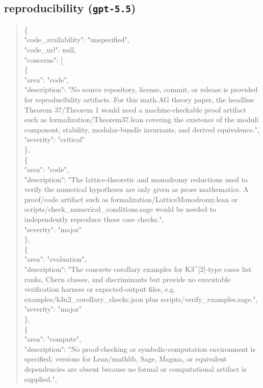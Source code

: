 \documentclass[11pt]{article}
\begin{document}
\subsection*{reproducibility (\texttt{gpt-5.5})}
\begin{quote}\small\ttfamily\raggedright
\{\\
  "code\_availability": "unspecified",\\
  "code\_url": null,\\
  "concerns": [\\
    \{\\
      "area": "code",\\
      "description": "No source repository, license, commit, or release is provided for reproducibility artifacts. For this math.AG theory paper, the headline Theorem 37/Theorem 1 would need a machine-checkable proof artifact such as formalization/Theorem37.lean covering the existence of the moduli component, stability, modular-bundle invariants, and derived equivalence.",\\
      "severity": "critical"\\
    \},\\
    \{\\
      "area": "code",\\
      "description": "The lattice-theoretic and monodromy reductions used to verify the numerical hypotheses are only given as prose mathematics. A proof/code artifact such as formalization/LatticeMonodromy.lean or scripts/check\_numerical\_conditions.sage would be needed to independently reproduce those case checks.",\\
      "severity": "major"\\
    \},\\
    \{\\
      "area": "evaluation",\\
      "description": "The concrete corollary examples for K3\^{}[2]-type cases list ranks, Chern classes, and discriminants but provide no executable verification harness or expected-output files, e.g. examples/k3n2\_corollary\_checks.json plus scripts/verify\_examples.sage.",\\
      "severity": "major"\\
    \},\\
    \{\\
      "area": "compute",\\
      "description": "No proof-checking or symbolic-computation environment is specified; versions for Lean/mathlib, Sage, Magma, or equivalent dependencies are absent because no formal or computational artifact is supplied.",\\

\end{quote}
\end{document}
